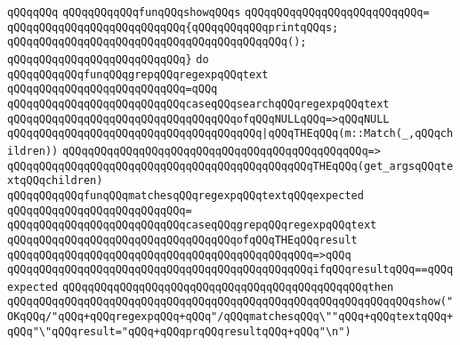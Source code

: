 \verb|qQQqqQQq|\newline
\verb|qQQqqQQqqQQqfunqQQqshowqQQqs|\newline
\verb|qQQqqQQqqQQqqQQqqQQqqQQqqQQq=|\newline
\verb|qQQqqQQqqQQqqQQqqQQqqQQqqQQq{qQQqqQQqqQQqprintqQQqs;|\newline
\verb|qQQqqQQqqQQqqQQqqQQqqQQqqQQqqQQqqQQqqQQqqQQq();|\newline
\verb|qQQqqQQqqQQqqQQqqQQqqQQqqQQq}|\newline
\newline
\verb|do|\newline
\verb|qQQqqQQqqQQqfunqQQqgrepqQQqregexpqQQqtext|\newline
\verb|qQQqqQQqqQQqqQQqqQQqqQQqqQQq=qQQq|\newline
\verb|qQQqqQQqqQQqqQQqqQQqqQQqqQQqcaseqQQqsearchqQQqregexpqQQqtext|\newline
\newline
\verb|qQQqqQQqqQQqqQQqqQQqqQQqqQQqqQQqqQQqofqQQqNULLqQQq=>qQQqNULL|\newline
\newline
\verb|qQQqqQQqqQQqqQQqqQQqqQQqqQQqqQQqqQQqqQQq|\verb#|qQQqTHEqQQq(m::Match(_,qQQqchildren))#\newline
\verb|qQQqqQQqqQQqqQQqqQQqqQQqqQQqqQQqqQQqqQQqqQQqqQQq=>|\newline
\verb|qQQqqQQqqQQqqQQqqQQqqQQqqQQqqQQqqQQqqQQqqQQqqQQqTHEqQQq(get_argsqQQqtextqQQqchildren)|\newline
\newline
\verb|qQQqqQQqqQQqfunqQQqmatchesqQQqregexpqQQqtextqQQqexpected|\newline
\verb|qQQqqQQqqQQqqQQqqQQqqQQqqQQq=|\newline
\verb|qQQqqQQqqQQqqQQqqQQqqQQqqQQqcaseqQQqgrepqQQqregexpqQQqtext|\newline
\newline
\verb|qQQqqQQqqQQqqQQqqQQqqQQqqQQqqQQqqQQqofqQQqTHEqQQqresult|\newline
\verb|qQQqqQQqqQQqqQQqqQQqqQQqqQQqqQQqqQQqqQQqqQQqqQQq=>qQQq|\newline
\verb|qQQqqQQqqQQqqQQqqQQqqQQqqQQqqQQqqQQqqQQqqQQqqQQqifqQQqresultqQQq==qQQqexpected|\newline
\verb|qQQqqQQqqQQqqQQqqQQqqQQqqQQqqQQqqQQqqQQqqQQqqQQqthen|\newline
\verb|qQQqqQQqqQQqqQQqqQQqqQQqqQQqqQQqqQQqqQQqqQQqqQQqqQQqqQQqqQQqqQQqshow("OKqQQq/"qQQq+qQQqregexpqQQq+qQQq"/qQQqmatchesqQQq\""qQQq+qQQqtextqQQq+qQQq"\"qQQqresult="qQQq+qQQqprqQQqresultqQQq+qQQq"\n")|\newline
